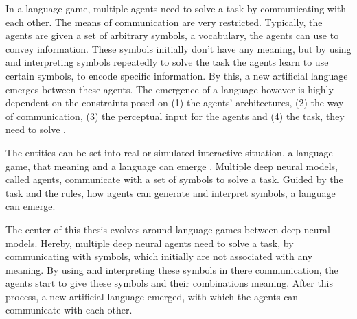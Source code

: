In a language game, multiple agents need to solve a task by communicating with each other.
The means of communication are very restricted.
Typically, the agents are given a set of arbitrary symbols, a vocabulary, the agents can use to convey information.
These symbols initially don't have any meaning, but by using and interpreting symbols repeatedly to solve the task the agents learn to use certain symbols, to encode specific information.
By this, a new artificial language emerges between these agents.
The emergence of a language however is highly dependent on the constraints posed on (1) the agents' architectures, (2) the way of communication, (3) the perceptual input for the agents and (4) the task, they need to solve \citep{Baroni2022}.



The entities can be set into real or simulated interactive situation, a language game, that meaning and a language can emerge \citep{Kirby2002}.
Multiple deep neural models, called agents, communicate with a set of symbols to solve a task.
Guided by the task and the rules, how agents can generate and interpret symbols, a language can emerge.



The center of this thesis evolves around language games between deep neural models.
Hereby, multiple deep neural agents need to solve a task, by communicating with symbols, which initially are not associated with any meaning.
By using and interpreting these symbols in there communication, the agents start to give these symbols and their combinations meaning.
After this process, a new artificial language emerged, with which the agents can communicate with each other.


